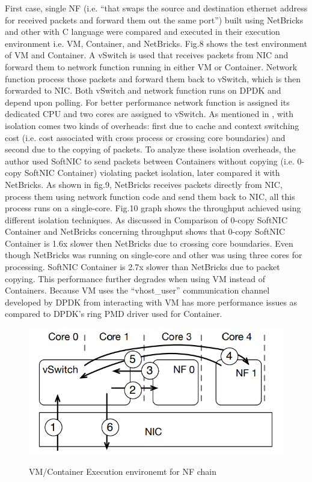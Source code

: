 \documentclass[10pt, a4paper, conference]{IEEEtran}
\begin{document}
First case, single NF (i.e. “that swaps the source and destination ethernet address for received packets and forward them out the same port”) built using NetBricks and other with C language were compared and executed in their execution environment i.e. VM, Container, and NetBricks. Fig.8 shows the test environment of VM and Container. A vSwitch is used that receives packets from NIC and forward them to network function running in either VM or Container. Network function process those packets and forward them back to vSwitch, which is then forwarded to NIC. Both vSwitch and network function runs on DPDK and depend upon polling. For better performance network function is assigned its dedicated CPU and two cores are assigned to vSwitch. As mentioned in \cite{Panda2016}, with isolation comes two kinds of overheads: first due to cache and context switching cost (i.e. cost associated with cross process or crossing core boundaries) and second due to the copying of packets. To analyze these isolation overheads, the author used SoftNIC to send packets between Containers without copying (i.e. 0-copy SoftNIC Container) violating packet isolation, later compared it with NetBricks. As shown in fig.9, NetBricks receives packets directly from NIC, process them using network function code and send them back to NIC, all this process runs on a single-core. Fig.10 graph shows the throughput achieved using different isolation techniques. As discussed in \cite{Panda2016} Comparison of 0-copy SoftNIC Container and NetBricks concerning throughput shows that 0-copy SoftNIC Container is 1.6x slower then NetBricks due to crossing core boundaries. Even though NetBricks was running on single-core and other was using three cores for processing. SoftNIC Container is 2.7x slower than NetBricks due to packet copying. This performance further degrades when using VM instead of Containers. Because VM uses the “vhost\_user” communication channel developed by DPDK from interacting with VM has more performance issues as compared to DPDK’s ring PMD driver used for Container.
\begin{figure}
	\centering
	\includegraphics[width=\linewidth]{figures/fig9}
	\caption{VM/Container Execution environemt for NF chain}
	\cite{Panda2016}
	\label{key11}
\end{figure}
\end{document}
